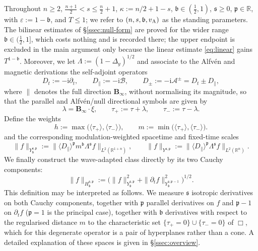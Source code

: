 \documentclass[11pt,reqno]{amsart}
\theoremstyle{plain}
\theoremstyle{definition}
\theoremstyle{remark}
\numberwithin{equation}{section}
\newcommand{\breg}{\mathfrak b}
\newcommand{\sreg}{\mathfrak s}
\newcommand{\preg}{\mathfrak p}
\newcommand{\Binf}{\mathbf B_\infty}
\newcommand{\Real}{\mathbb R}
\begin{document}
Throughout $n\ge2$, $\frac{n+1}2<s\le\frac n2+1$, $\kappa:=n/2+1-s$, $\breg\in(\frac12,1)$, $\sreg\ge0$, $\preg\in\Real$, with
$\varepsilon:=1-\breg$, and $T\le1$; we refer to $(n,s,\breg,v_{\rm A})$ as the
standing parameters.  The bilinear estimates of
\S\ref{ssec:null-form} are proved for the wider range $\breg\in(\frac12,1]$,
which costs nothing and is recorded there; the upper endpoint is excluded in the
main argument only because the linear estimate \eqref{eq:linear} gains
$T^{1-\breg}$. Moreover, we let $\Lambda:=(1-\Delta_{y})^{1/2}$ and associate to the Alfvén and magnetic derivations the self-adjoint operators
\begin{equation}\label{eq:self-adjoint-derivatives}
    D_t:=-\mathrm i\partial_t,\qquad
    D_{\parallel}:=-\mathrm i\mathcal B, \qquad
    D_{\pm}:=-\mathrm i\mathcal A^{\pm}=D_t\pm D_{\parallel},
\end{equation}
where $\parallel$ denotes the full direction $\Binf$, without normalising its
magnitude, so that the parallel and Alfv\'en/null directional symbols are given by
\begin{equation}\label{eq:taupm}
    \lambda=\Binf\cdot\xi, \qquad\tau_+:=\tau+\lambda,\qquad \tau_-:=\tau-\lambda.
\end{equation}
Define the weights
\begin{equation}\label{eq:weightshm}
     h:=\max\big(\langle\tau_+\rangle,\langle\tau_-\rangle\big),\qquad
 m:=\min\big(\langle\tau_+\rangle,\langle\tau_-\rangle\big).
\end{equation}
and the corresponding modulation-weighted spacetime and fixed-time scales
\begin{equation}\label{eq:Y}
\|f\|_{Y^{\sreg,\preg}_{\breg}}:=\big\|\langle D_{\parallel}\rangle^{\preg}m^{\breg}\Lambda^{\sreg}f\big\|_{L^{2}(\mathbb{R}^{1+n})},
\qquad
\|f\|_{Y^{\sreg,\preg}}:=\big\|\langle D_{\parallel}\rangle^{\preg}\Lambda^{\sreg}f\big\|_{L^{2}(\mathbb{R}^{n})}.
\end{equation}
We finally construct the wave-adapted class directly by its two Cauchy components:
\begin{equation}\label{eq:Hpair}
\|f\|_{H^{\sreg,\preg}_{\breg}}:=
\Big(\|f\|_{Y^{\sreg,\preg}_{\breg}}^{2}
+\|\partial_tf\|_{Y^{\sreg,\preg-1}_{\breg}}^{2}\Big)^{1/2}.
\end{equation}
This definition may be interpreted as follows. We measure
$\sreg$ isotropic derivatives on both Cauchy components, together with
$\preg$ parallel derivatives on $f$ and $\preg-1$ on $\partial_tf$
($\preg=1$ is the principal case), together with $\breg$ derivatives with respect to the regularised distance $m$ to the characteristic set $\{\tau_+=0\}\cup\{\tau_-=0\}$ of $\Box$, which for this degenerate operator is a pair of hyperplanes rather than a cone. A detailed explanation of these spaces is given in \S\ref{ssec:overview}.
\end{document}
